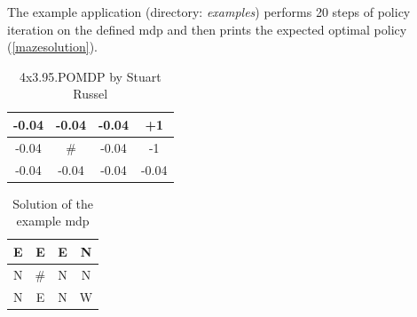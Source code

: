 The example application (directory: \emph{examples}) performs 20 steps of policy iteration on the defined mdp and then prints the expected optimal policy (\autoref{mazesolution}).

\begin{table}[]
	\centering
	\begin{tabular}{|c|c|c|c|}
		\hline
		-0.04 & -0.04                      & -0.04 & \cellcolor[HTML]{9AFF99}+1 \\ \hline
		-0.04 & \cellcolor[HTML]{C0C0C0}\# & -0.04 & \cellcolor[HTML]{FFCCC9}-1 \\ \hline
		-0.04 & -0.04                      & -0.04 & -0.04                      \\ \hline
	\end{tabular}
	\caption{4x3.95.POMDP by Stuart Russel}
	\label{maze}
\end{table}

\begin{table}[]
	\centering
	\begin{tabular}{|c|c|c|c|}
		\hline
		E & E                          & E & \cellcolor[HTML]{9AFF99}N \\ \hline
		N & \cellcolor[HTML]{C0C0C0}\# & N & \cellcolor[HTML]{FFCCC9}N \\ \hline
		N & E                          & N & W                         \\ \hline
	\end{tabular}
	\caption{Solution of the example mdp}
	\label{mazesolution}
\end{table}

